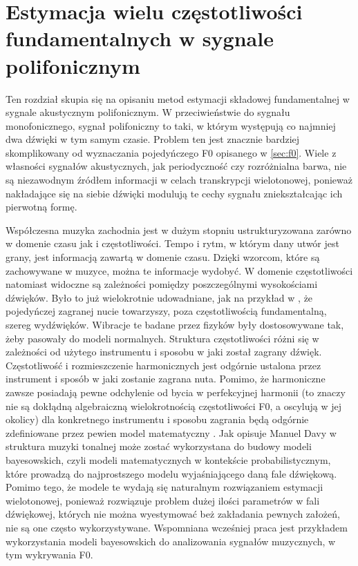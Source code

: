 \documentclass[12pt,a4paper,twoside]{mwart}
\begin{document}
\clearpage
\section{Estymacja wielu częstotliwości fundamentalnych w sygnale polifonicznym}\label{sec:MultiPitch}
Ten rozdział skupia się na opisaniu metod estymacji składowej fundamentalnej w sygnale akustycznym polifonicznym. W przeciwieństwie do sygnału monofonicznego,  sygnał polifoniczny to taki, w którym występują co najmniej dwa dźwięki w tym samym czasie. Problem ten jest znacznie bardziej skomplikowany od wyznaczania pojedyńczego F0 opisanego w \ref{sec:f0}. Wiele z własności sygnałów akustycznych, jak periodyczność czy rozróżnialna barwa, nie są niezawodnym źródłem informacji w celach transkrypcji wielotonowej, ponieważ nakładające się na siebie dźwięki modulują te cechy sygnału zniekształcając ich pierwotną formę.

Współczesna muzyka zachodnia jest w dużym stopniu ustrukturyzowana zarówno w domenie czasu jak i częstotliwości. Tempo i rytm, w którym dany utwór jest grany, jest informacją zawartą w domenie czasu. Dzięki wzorcom, które są zachowywane w muzyce, można te informacje wydobyć. W domenie częstotliwości natomiast widoczne są zależności pomiędzy poszczególnymi wysokościami dźwięków. Było to już wielokrotnie udowadniane, jak na przykład w \cite[1325-1326]{Transcription:Mcintyre:OnTheOscilation}, że pojedyńczej zagranej nucie towarzyszy, poza częstotliwością fundamentalną, szereg wydźwięków. Wibracje te badane przez fizyków były dostosowywane tak, żeby pasowały do modeli normalnych. Struktura częstotliwości różni się w zależności od użytego instrumentu i sposobu w jaki został zagrany dźwięk. Częstotliwość i rozmieszczenie harmonicznych jest odgórnie ustalona przez instrument i sposób w jaki zostanie zagrana nuta. Pomimo, że harmoniczne zawsze posiadają pewne odchylenie od bycia w perfekcyjnej harmonii (to znaczy nie są dokłądną algebraiczną wielokrotnością częstotliwości F0, a oscylują w jej okolicy) dla konkretnego instrumentu i sposobu zagrania będą odgórnie zdefiniowane przez pewien model matematyczny \cite[1326-1327]{Transcription:Mcintyre:OnTheOscilation}. Jak opisuje Manuel Davy w \cite[203-204]{Transcription:Anssi:SignalProcessingMethods} struktura muzyki tonalnej może zostać wykorzystana do budowy modeli bayesowskich, czyli modeli matematycznych w kontekście probabilistycznym, które prowadzą do najprostszego modelu wyjaśniającego daną fale dźwiękową. Pomimo tego, że modele te wydają się naturalnym rozwiązaniem estymacji wielotonowej, ponieważ rozwiązuje problem dużej ilości parametrów w fali dźwiękowej, których nie można wyestymować beż zakładania pewnych założeń, nie są one często wykorzystywane. Wspomniana wcześniej praca \cite{Transcription:BayesianHarmonicModels} jest przykładem wykorzystania modeli bayesowskich do analizowania sygnałów muzycznych, w tym wykrywania F0.
\end{document}
